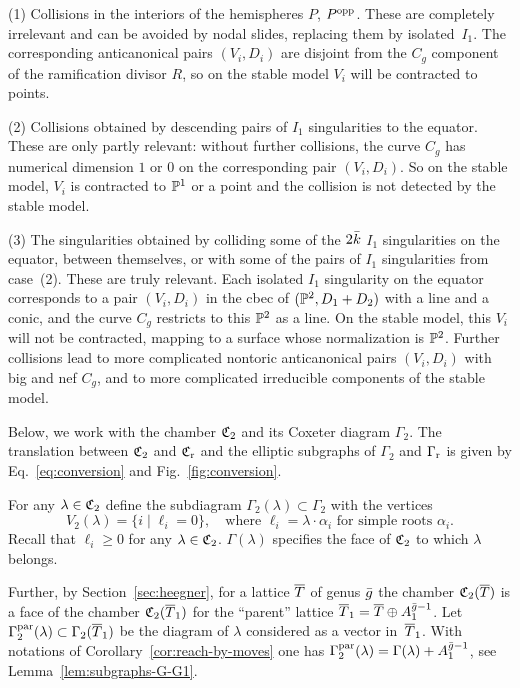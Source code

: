 \documentclass{amsart}
\begin{document}
\smallskip

(1) Collisions in the interiors of the hemispheres $P$,
$P^{\rm opp}$. These are completely irrelevant and can be avoided by nodal
slides, replacing them by isolated~$I_1$.
The corresponding anticanonical pairs
$(V_i,D_i)$ are disjoint from the $C_g$ component of the ramification
divisor $R$, so on the stable model $V_i$ will be contracted to points.

\smallskip
  
(2) Collisions obtained by descending pairs of $I_1$ singularities
to the equator. These are only
partly relevant: without further collisions, the curve $C_g$ has numerical
dimension $1$ or $0$ on the corresponding
pair $(V_i,D_i)$. So on the stable model, $V_i$ is contracted to ${\mathbb P}^1$ or a point
and the collision is not detected by the stable model.

\smallskip

(3) The singularities obtained by colliding some of the $2\bar k$ $I_1$
singularities on the equator, between themselves, or with some of the
pairs of $I_1$ singularities from case~(2). These are truly
relevant. Each isolated $I_1$ singularity on the equator corresponds to
a pair $(V_i,D_i)$ in the cbec of $({\mathbb P}^2,D_1+D_2)$ with a line and a
conic, and the curve $C_g$ restricts to this ${\mathbb P}^2$ as a line. On the
stable model, this $V_i$ will not be contracted, mapping to a surface
whose normalization is ${\mathbb P}^2$. Further collisions lead
to more complicated nontoric anticanonical pairs $(V_i,D_i)$ with big
and nef $C_g$, and to more complicated irreducible components of the
stable model. 

\medskip

Below, we work with the chamber ${\mathfrak C}_2$ and its Coxeter diagram
$\Gamma_2$. The translation between ${\mathfrak C}_2$ and ${\mathfrak C}_{\rm r}$ and the
elliptic subgraphs of $\Gamma_2$ and $\Gamma_{\rm r}$
is given by Eq.~\eqref{eq:conversion} and Fig.~\ref{fig:conversion}.

\begin{definition}\label{def:lambda-subgraph}
  For any $\lambda\in{\mathfrak C}_2$  define the
  subdiagram $\Gamma_2(\lambda)\subset\Gamma_2$ with the vertices
  \begin{displaymath}
    V_2(\lambda) = \{ i \mid \ell_i = 0 \},
    \quad\text{where } \ell_i = \lambda\cdot\alpha_i
    \text{ for simple roots } \alpha_i.
  \end{displaymath}
  Recall that $\ell_i\ge0$ for any $\lambda\in{\mathfrak C}_2$.  $\Gamma(\lambda)$
  specifies the face of ${\mathfrak C}_2$ to which $\lambda$ belongs.  

  Further, by Section~\ref{sec:heegner}, for a lattice ${\overline T}$ of genus
  $\bar g$ the chamber ${\mathfrak C}_2({\overline T})$ 
  is a face of the chamber ${\mathfrak C}_2({\overline T}_1)$ for the ``parent'' lattice
  ${\overline T}_1 = {\overline T}\oplus A_1^{\bar g-1}$. Let
  $\Gamma_2^{\rm par}(\lambda)\subset\Gamma_2({\overline T}_1)$ be the
  diagram of $\lambda$ considered as a vector in~${\overline T}_1$.
  With notations of Corollary~\ref{cor:reach-by-moves} one has
  $\Gamma_2^{\rm par}(\lambda) = \Gamma(\lambda) + A_1^{\bar g-1}$, see
  Lemma~\ref{lem:subgraphs-G-G1}. 
\end{definition}
\end{document}

